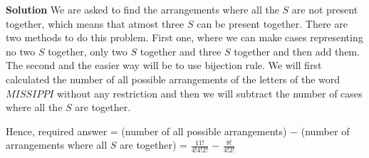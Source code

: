 \documentclass[12pt, a4paper]{article}
\begin{document}
\textbf{Solution} We are asked to find the arrangements where all the $S$ are not present together, which means that atmost three $S$ can be present together. There are two methods to do this problem. First one, where we can make cases representing no two $S$ together, only two $S$ together and three $S$ together and then add them. The second and the easier way will be to use bijection rule. We will first calculated the number of all possible arrangements of the letters of the word $MISSIPPI$ without any restriction and then we will subtract the number of cases where all the $S$ are together.
\begin{center}
 Hence, required answer = (number of all possible arrangements) $-$ (number of arrangements where all $S$ are together) \newline = $\frac{11!}{4!4!2!}$ $-$ $\frac{8!}{4!2!}$
\end{center}



   
  
\end{document}
